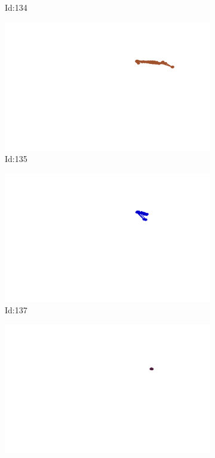 \documentclass[12pt,twoside]{report}
\begin{document}
\begin{figure}
\begin{subfigure}[b]{0.20\textwidth}
\caption{Id:134}
\end{subfigure}
\begin{subfigure}[b]{0.20\textwidth}
\centering
\includegraphics[width=\textwidth]{../trajectories/135.png}
\caption{Id:135}
\end{subfigure}
\begin{subfigure}[b]{0.20\textwidth}
\centering
\includegraphics[width=\textwidth]{../trajectories/137.png}
\caption{Id:137}
\end{subfigure}
\begin{subfigure}[b]{0.20\textwidth}
\centering
\includegraphics[width=\textwidth]{../trajectories/141.png}

\end{subfigure}
\end{figure}
\end{document}
